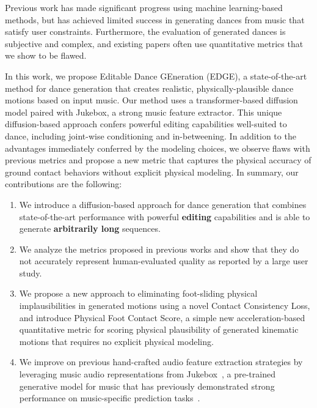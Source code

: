 \documentclass[10pt,twocolumn,letterpaper]{article}
\begin{document}
Previous work has made significant progress using machine learning-based methods, but has achieved limited success in generating dances from music that satisfy user constraints.
Furthermore, the evaluation of generated dances is subjective and complex, and existing papers often use quantitative metrics that we show to be flawed.

In this work, we propose Editable Dance GEneration (EDGE), a state-of-the-art method for dance generation that creates realistic, physically-plausible dance motions based on input music.
Our method uses a transformer-based diffusion model paired with Jukebox, a strong music feature extractor.
This unique diffusion-based approach confers powerful editing capabilities well-suited to dance, including joint-wise conditioning and in-betweening.
In addition to the advantages immediately conferred by the modeling choices, we observe flaws with previous metrics and propose a new metric that captures the physical accuracy of ground contact behaviors without explicit physical modeling.
In summary, our contributions are the following:
\vspace{10pt}
\begin{enumerate}[itemsep=0ex,partopsep=1ex,parsep=1ex, topsep=-0ex] 
    \item We introduce a diffusion-based approach for dance generation that combines state-of-the-art performance with powerful \textbf{editing} capabilities and is able to generate \textbf{arbitrarily long} sequences.
    \item We analyze the metrics proposed in previous works and show that they do not accurately represent human-evaluated quality as reported by a large user study.
    \item We propose a new approach to eliminating foot-sliding physical implausibilities in generated motions using a novel Contact Consistency Loss, and introduce Physical Foot Contact Score, a simple new acceleration-based quantitative metric for scoring physical plausibility of generated kinematic motions that requires no explicit physical modeling.
    \item We improve on previous hand-crafted audio feature extraction strategies by leveraging music audio representations from Jukebox~\cite{dhariwal2020jukebox}, a pre-trained generative model for music that has previously demonstrated strong performance on music-specific prediction tasks~\cite{castellon2021codified,donahue2021sheet}.
\end{enumerate}
\end{document}
